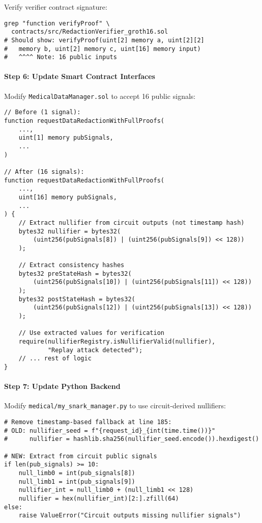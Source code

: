 Verify verifier contract signature:

\begin{verbatim}
grep "function verifyProof" \
  contracts/src/RedactionVerifier_groth16.sol
# Should show: verifyProof(uint[2] memory a, uint[2][2] 
#   memory b, uint[2] memory c, uint[16] memory input)
#   ^^^^ Note: 16 public inputs
\end{verbatim}

\paragraph{Step 6: Update Smart Contract Interfaces}

Modify \texttt{MedicalDataManager.sol} to accept 16 public signals:

\begin{verbatim}
// Before (1 signal):
function requestDataRedactionWithFullProofs(
    ...,
    uint[1] memory pubSignals,
    ...
)

// After (16 signals):
function requestDataRedactionWithFullProofs(
    ...,
    uint[16] memory pubSignals,
    ...
) {
    // Extract nullifier from circuit outputs (not timestamp hash)
    bytes32 nullifier = bytes32(
        (uint256(pubSignals[8]) | (uint256(pubSignals[9]) << 128))
    );
    
    // Extract consistency hashes
    bytes32 preStateHash = bytes32(
        (uint256(pubSignals[10]) | (uint256(pubSignals[11]) << 128))
    );
    bytes32 postStateHash = bytes32(
        (uint256(pubSignals[12]) | (uint256(pubSignals[13]) << 128))
    );
    
    // Use extracted values for verification
    require(nullifierRegistry.isNullifierValid(nullifier), 
            "Replay attack detected");
    // ... rest of logic
}
\end{verbatim}

\paragraph{Step 7: Update Python Backend}

Modify \texttt{medical/my\_snark\_manager.py} to use circuit-derived nullifiers:

\begin{verbatim}
# Remove timestamp-based fallback at line 185:
# OLD: nullifier_seed = f"{request_id}_{int(time.time())}"
#      nullifier = hashlib.sha256(nullifier_seed.encode()).hexdigest()

# NEW: Extract from circuit public signals
if len(pub_signals) >= 10:
    null_limb0 = int(pub_signals[8])
    null_limb1 = int(pub_signals[9])
    nullifier_int = null_limb0 + (null_limb1 << 128)
    nullifier = hex(nullifier_int)[2:].zfill(64)
else:
    raise ValueError("Circuit outputs missing nullifier signals")
\end{verbatim}

